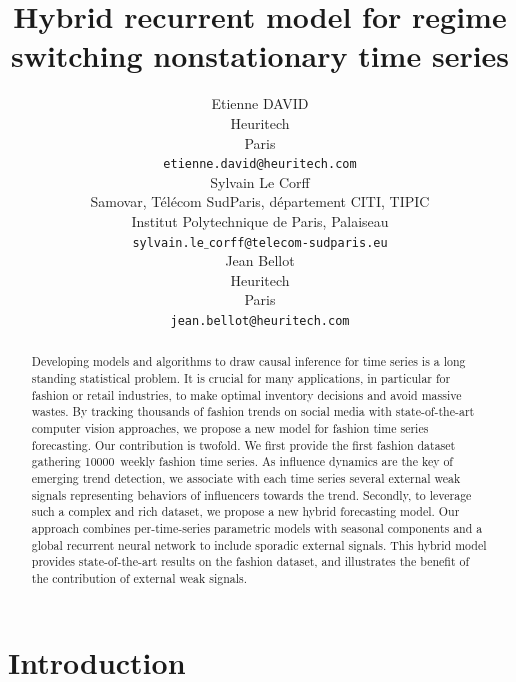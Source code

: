 \documentclass{article} %
\title{Hybrid recurrent model for regime switching nonstationary time series}
\author{Etienne DAVID \\
Heuritech \\
Paris \\
\texttt{etienne.david@heuritech.com} \\
\And
Sylvain Le Corff \\
Samovar, T\'el\'ecom SudParis, d\'epartement CITI, TIPIC \\
Institut Polytechnique de Paris, Palaiseau \\
\texttt{sylvain.le$\_$corff@telecom-sudparis.eu} \\
\And 
Jean Bellot \\
Heuritech \\
Paris \\
\texttt{jean.bellot@heuritech.com} \\
}
\newcommand{\numberts}{10000}
\begin{document}
\maketitle

\begin{abstract}
Developing models and algorithms to draw causal inference for time series is a long standing statistical problem. It is crucial for many applications, in particular for fashion or retail industries, to make optimal inventory decisions and avoid massive wastes. By tracking thousands of fashion trends on social media with state-of-the-art computer vision approaches, we propose a new model for fashion time series forecasting. Our contribution is  twofold. We first provide the first fashion dataset gathering \numberts\ weekly fashion time series. As influence dynamics are the key of emerging trend detection, we associate with each time series several external weak signals representing behaviors of influencers towards the trend. Secondly, to leverage such a complex and rich dataset, we propose a new hybrid forecasting model. Our approach combines per-time-series parametric models with seasonal components and a global recurrent neural network to include sporadic external signals. This hybrid model provides state-of-the-art results on the fashion dataset, and illustrates the benefit of the contribution of external weak signals.
\end{abstract}

\section{Introduction}
\end{document}
